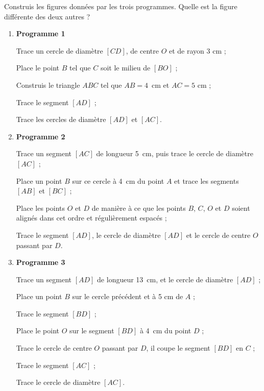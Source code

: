 
\vspace*{1cm}

\phantom{Pour sauter une ligne}

\newpage




\begin{exercice}[Un intrus]
Construis les figures données par les trois programmes. Quelle est la figure différente des deux autres ?

\begin{enumerate}
 \item \textbf{Programme 1}
 
Trace un cercle de diamètre $[CD]$, de centre $O$ et de rayon 3 cm ;

Place le point $B$ tel que $C$ soit le milieu de $[BO]$ ;

Construis le triangle $ABC$ tel que $AB = 4$ cm et $AC = 5$ cm ;

Trace le segment $[AD]$ ;

Trace les cercles de diamètre $[AD]$ et $[AC]$.

 \item \textbf{Programme 2}
 
Trace un segment $[AC]$ de longueur 5 cm, puis trace le cercle de diamètre $[AC]$ ;

Place un point $B$ sur ce cercle à 4 cm du point $A$ et trace les segments $[AB]$ et $[BC]$ ;

Place les points $O$ et $D$ de manière à ce que les points $B$, $C$, $O$ et $D$ soient alignés dans cet ordre et régulièrement espacés ;

Trace le segment $[AD]$, le cercle de diamètre $[AD]$ et le cercle de centre $O$ passant par $D$.
 \item \textbf{Programme 3}
 
Trace un segment $[AD]$ de longueur 13 cm, et le cercle de diamètre $[AD]$ ;

Place un point $B$ sur le cercle précédent et à 5 cm de $A$ ;

Trace le segment $[BD]$ ;

Place le point $O$ sur le segment $[BD]$ à 4 cm du point $D$ ;

Trace le cercle de centre $O$ passant par $D$, il coupe le segment $[BD]$ en $C$ ;

Trace le segment $[AC]$ ;

Trace le cercle de diamètre $[AC]$.
 \end{enumerate}
\end{exercice}
